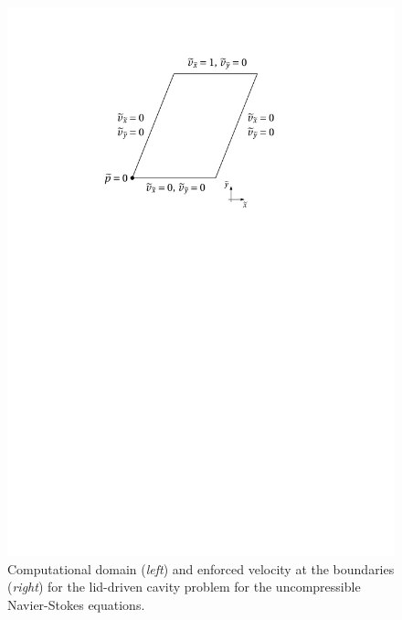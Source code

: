 \documentclass[12pt, a4paper, twoside, openright, notitlepage]{report}
\numberwithin{equation}{chapter}
\theoremstyle{theorem}
\theoremstyle{definition}
\theoremstyle{remark}
\theoremstyle{proposition}
\numberwithin{figure}{chapter}
\begin{document}
\begin{figure}[t!]
			\includegraphics[scale = 0.65]{dc_domain_bc}
			
			\caption{Computational domain (\emph{left}) and enforced velocity at the boundaries (\emph{right}) for the lid-driven cavity problem for the uncompressible Navier-Stokes equations.}
			\label{fig:dc-domain}
		\end{figure}
				
				
\end{document}
